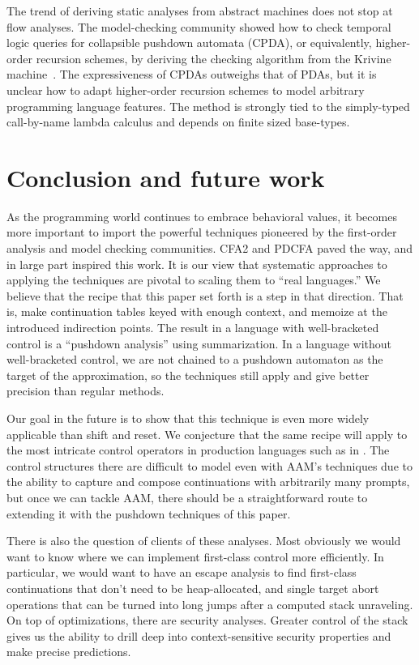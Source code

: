 The trend of deriving static analyses from abstract machines does not stop at flow analyses.
%
The model-checking community showed how to check temporal logic queries for collapsible pushdown automata (CPDA), or equivalently, higher-order recursion schemes, by deriving the checking algorithm from the Krivine machine~\citep{ianjohnson:Salvati:2011:KMH:2027223.027239}.
%
The expressiveness of CPDAs outweighs that of PDAs, but it is unclear how to adapt higher-order recursion schemes to model arbitrary programming language features.
%
The method is strongly tied to the simply-typed call-by-name lambda calculus and depends on finite sized base-types.

\section{Conclusion and future work}

As the programming world continues to embrace behavioral values, it becomes more important to import the powerful techniques pioneered by the first-order analysis and model checking communities.
%
CFA2 and PDCFA paved the way, and in large part inspired this work.
%
It is our view that systematic approaches to applying the techniques are pivotal to scaling them to ``real languages.''
%
We believe that the recipe that this paper set forth is a step in that direction.
%
That is, make continuation tables keyed with enough context, and memoize at the introduced indirection points.
%
The result in a language with well-bracketed control is a ``pushdown analysis'' using summarization.
%
In a language without well-bracketed control, we are not chained to a pushdown automaton as the target of the approximation, so the techniques still apply and give better precision than regular methods.

Our goal in the future is to show that this technique is even more widely applicable than shift and reset.
%
We conjecture that the same recipe will apply to the most intricate control operators in production languages such as in \citet{ianjohnson:Flatt:2007:ADC:1291151.1291178}.
%
The control structures there are difficult to model even with AAM's techniques due to the ability to capture and compose continuations with arbitrarily many prompts, but once we can tackle AAM, there should be a straightforward route to extending it with the pushdown techniques of this paper.

There is also the question of clients of these analyses.
%
Most obviously we would want to know where we can implement first-class control more efficiently.
%
In particular, we would want to have an escape analysis to find first-class continuations that don't need to be heap-allocated, and single target abort operations that can be turned into long jumps after a computed stack unraveling.
%
On top of optimizations, there are security analyses.
%
Greater control of the stack gives us the ability to drill deep into context-sensitive security properties and make precise predictions.
